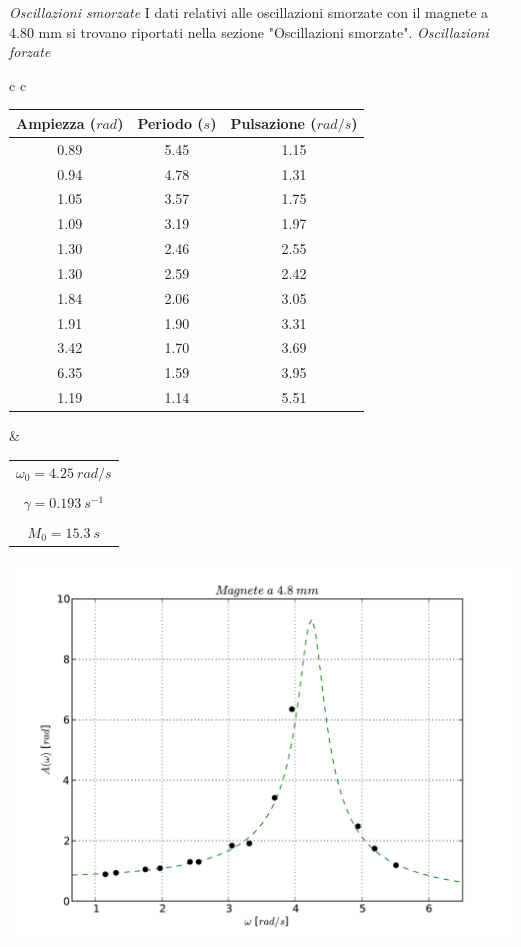 \textit{Oscillazioni smorzate}
I dati relativi alle oscillazioni smorzate con il magnete a 4.80 mm si trovano riportati nella sezione "Oscillazioni smorzate".
\textit{Oscillazioni forzate}
\begin{center}

\begin{tabular}{c c}

\begin{tabular}{c | c | c}
\textbf{Ampiezza ($rad$)} & \textbf{Periodo ($s$)} & \textbf{Pulsazione ($rad/s$)}\\
\midrule
0.89 & 5.45 & 1.15\\
0.94 & 4.78 & 1.31\\
1.05 & 3.57 & 1.75\\
1.09 & 3.19 & 1.97\\
1.30 & 2.46 & 2.55\\
1.30 & 2.59 & 2.42\\
1.84 & 2.06 & 3.05\\
1.91 & 1.90 & 3.31\\
3.42 & 1.70 & 3.69\\
6.35 & 1.59 & 3.95\\
1.19 & 1.14 & 5.51\\
\end{tabular}

& \hspace{1cm} 

\begin{tabular}{c}
$ \omega_0 = 4.25\ rad/s $\\
\\
$ \gamma = 0.193\ s^{-1}$\\
\\
$ M_0 = 15.3\ s$\\
\end{tabular} 

\end{tabular}

\end{center}
 
\begin{center}

\includegraphics[scale=0.5]{"../grafici/Magnetea48mm"}


\end{center}
 
